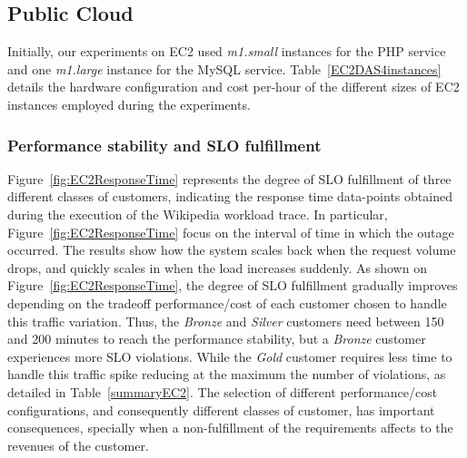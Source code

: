 

\subsection{Public Cloud}

Initially, our experiments on EC2 used \emph{m1.small} instances for the PHP service and one \emph{m1.large} instance for the MySQL service. Table~\ref{EC2DAS4instances} details the hardware configuration and cost per-hour of the different sizes of EC2 instances employed during the experiments.




\subsubsection{Performance stability and SLO fulfillment} 
Figure~\ref{fig:EC2ResponseTime} represents the degree of SLO fulfillment of three different classes of customers, indicating the response time data-points obtained during the execution of the Wikipedia workload trace. In particular, Figure~\ref{fig:EC2ResponseTime} focus on the interval of time in which the outage occurred. The results show how the system scales back when the request volume drops, and quickly scales in when the load increases suddenly. As shown on Figure~\ref{fig:EC2ResponseTime},  the degree of SLO fulfillment gradually improves depending on the tradeoff performance/cost of each customer chosen to handle this traffic variation. Thus, the \emph{Bronze} and \emph{Silver} customers need between 150 and 200 minutes to reach the performance stability,  but a \emph{Bronze} customer experiences more SLO violations. While the \emph{Gold} customer requires less time to handle this traffic spike reducing at the maximum the number of violations, as detailed in Table~\ref{summaryEC2}. The selection of different performance/cost configurations, and consequently different classes of customer, has important consequences, specially when a non-fulfillment of the requirements affects to the revenues of the customer.

\setcounter{figure}{6}

